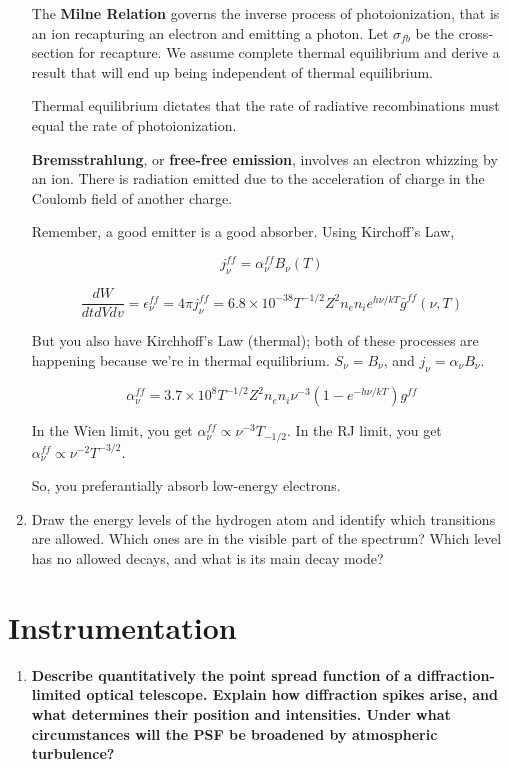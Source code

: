 \documentclass[12pt, letterpaper, preprint]{aastex}
\begin{document}
\begin{enumerate}
The \textbf{Milne Relation} governs the inverse process
of photoionization, that is an ion recapturing an electron
and emitting a photon. Let $\sigma_{fb}$ be the cross-section
for recapture. We assume complete thermal equilibrium
and derive a result that will end up being independent of
thermal equilibrium. 

Thermal equilibrium dictates that the rate of radiative
recombinations must equal the rate of photoionization.

\textbf{Bremsstrahlung}, or \textbf{free-free emission},
involves an electron whizzing by an ion. There is radiation
emitted due to the acceleration of charge in the Coulomb field
of another charge.

Remember, a good emitter is a good absorber. Using Kirchoff's Law,

$$ j_\nu^{ff} = \alpha_\nu^{ff} B_\nu (T) $$

\begin{equation}
  \frac{dW}{dt dV dv} = \epsilon_\nu^{ff} = 4 \pi j_\nu^{ff} 
  = 6.8 \times 10^{-38} T^{-1/2} Z^2 n_e n_i e^{h \nu / kT}
  \bar{g}^{ff} (\nu,T)
  \label{bremsstrahlung}
\end{equation}

But you also have Kirchhoff's Law (thermal); both of these
processes are happening because we're in thermal equilibrium.
$S_\nu = B_\nu$, and $j_\nu = \alpha_\nu B_\nu$. 

\begin{equation}
  \alpha_\nu^{ff} = 3.7 \times 10^8 T^{-1/2} Z^2 n_e n_i \nu^{-3}
  (1-e^{-h\nu/kT}) g^{ff}
\end{equation}

In the Wien limit, you get $\alpha_\nu^{ff} \propto \nu^{-3} T_{-1/2}$.
In the RJ limit, you get $\alpha_\nu^{ff} \propto \nu^{-2} T^{-3/2}$.

So, you preferantially absorb low-energy electrons.


  \item Draw the energy levels of the hydrogen atom and 
    identify which transitions are allowed. 
    Which ones are in the visible part of the spectrum? 
    Which level has no allowed decays, and what is its main decay mode?
\end{enumerate}

\section*{Instrumentation}

\begin{enumerate}
  \item \textbf{Describe quantitatively the point spread function 
      of a diffraction-limited optical telescope. 
      Explain how diffraction spikes arise, 
      and what determines their position and intensities. 
      Under what circumstances will the PSF be broadened by atmospheric
      turbulence?}
\end{enumerate}
\end{document}
